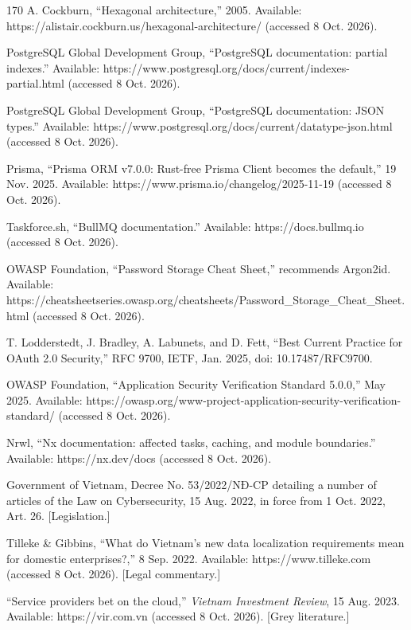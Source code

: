 \begin{thebibliography}{170}
 A. Cockburn, ``Hexagonal architecture,'' 2005. Available: https://alistair.cockburn.us/hexagonal-architecture/ (accessed 8 Oct. 2026).

 PostgreSQL Global Development Group, ``PostgreSQL documentation: partial indexes.'' Available: https://www.postgresql.org/docs/current/indexes-partial.html (accessed 8 Oct. 2026).

 PostgreSQL Global Development Group, ``PostgreSQL documentation: JSON types.'' Available: https://www.postgresql.org/docs/current/datatype-json.html (accessed 8 Oct. 2026).

 Prisma, ``Prisma ORM v7.0.0: Rust-free Prisma Client becomes the default,'' 19 Nov. 2025. Available: https://www.prisma.io/changelog/2025-11-19 (accessed 8 Oct. 2026).

 Taskforce.sh, ``BullMQ documentation.'' Available: https://docs.bullmq.io (accessed 8 Oct. 2026).

 OWASP Foundation, ``Password Storage Cheat Sheet,'' recommends Argon2id. Available: https://cheatsheetseries.owasp.org/cheatsheets/Password\_Storage\_Cheat\_Sheet.html (accessed 8 Oct. 2026).

 T. Lodderstedt, J. Bradley, A. Labunets, and D. Fett, ``Best Current Practice for OAuth 2.0 Security,'' RFC 9700, IETF, Jan. 2025, doi: 10.17487/RFC9700.

 OWASP Foundation, ``Application Security Verification Standard 5.0.0,'' May 2025. Available: https://owasp.org/www-project-application-security-verification-standard/ (accessed 8 Oct. 2026).

 Nrwl, ``Nx documentation: affected tasks, caching, and module boundaries.'' Available: https://nx.dev/docs (accessed 8 Oct. 2026).

 Government of Vietnam, Decree No. 53/2022/NĐ-CP detailing a number of articles of the Law on Cybersecurity, 15 Aug. 2022, in force from 1 Oct. 2022, Art. 26. [Legislation.]

 Tilleke \& Gibbins, ``What do Vietnam's new data localization requirements mean for domestic enterprises?,'' 8 Sep. 2022. Available: https://www.tilleke.com (accessed 8 Oct. 2026). [Legal commentary.]

 ``Service providers bet on the cloud,'' \textit{Vietnam Investment Review}, 15 Aug. 2023. Available: https://vir.com.vn (accessed 8 Oct. 2026). [Grey literature.]


\end{thebibliography}
